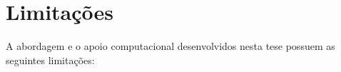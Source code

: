 
\section{Limitações}\label{sec:limitacoes_trabalho}

A abordagem e o apoio computacional desenvolvidos nesta tese possuem as seguintes limitações:

